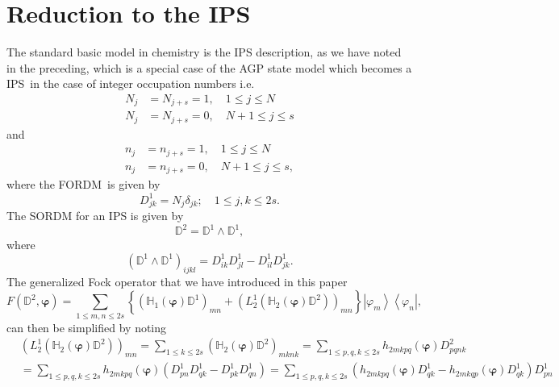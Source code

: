 \documentclass[aps,preprint]{revtex4}%
\begin{document}
\section{Reduction to the IPS \label{IPS}}

The standard basic model in chemistry is the IPS description, as we have noted
in the preceding, which is a special case of the AGP state model which becomes
a IPS\ in the case of integer occupation numbers i.e.
\begin{align}
N_{j}  &  =N_{j+s}=1,\quad1\leq j\leq N\nonumber\\
N_{j}  &  =N_{j+s}=0,\quad N+1\leq j\leq s
\end{align}
and%
\begin{align}
n_{j}  &  =n_{j+s}=1,\quad1\leq j\leq N\nonumber\\
n_{j}  &  =n_{j+s}=0,\quad N+1\leq j\leq s,
\end{align}
where the FORDM\ is given by
\begin{equation}
D_{jk}^{1}=N_{j}\delta_{jk};\quad1\leq j,k\leq2s.
\end{equation}
The SORDM for an IPS is given by
\begin{equation}
\mathbb{D}^{2}=\mathbb{D}^{1}\wedge\mathbb{D}^{1},
\end{equation}
where
\begin{equation}
\left(  \mathbb{D}^{1}\wedge\mathbb{D}^{1}\right)  _{ijkl}=D_{ik}^{1}%
D_{jl}^{1}-D_{il}^{1}D_{jk}^{1}.
\end{equation}
The generalized Fock operator that we have introduced in this paper
\begin{equation}
F\left(  \mathbb{D}^{2},\bm{\varphi}\right)  =\sum_{1\leq m,n\leq2s}\left\{
\left(  \mathbb{H}_{1}\left(  \bm{\varphi}\right)  \mathbb{D}^{1}\right)
_{mn}+\left(  L_{2}^{1}\left(  \mathbb{H}_{2}\left(  \bm{\varphi}\right)
\mathbb{D}^{2}\right)  \right)  _{mn}\right\}  \left\vert \varphi
_{m}\right\rangle \left\langle \varphi_{n}\right\vert , \label{F1}%
\end{equation}
can then be simplified by noting
\begin{align}
&  \left(  L_{2}^{1}\left(  \mathbb{H}_{2}\left(  \bm{\varphi}\right)
\mathbb{D}^{2}\right)  \right)  _{mn}=\sum_{1\leq k\leq2s}\left(
\mathbb{H}_{2}\left(  \bm{\varphi}\right)  \mathbb{D}^{2}\right)  _{mknk}%
=\sum_{1\leq p,q,k\leq2s}h_{2mkpq}\left(  \bm{\varphi}\right)  D_{pqnk}%
^{2}\nonumber\\
&  =\sum_{1\leq p,q,k\leq2s}h_{2mkpq}\left(  \bm{\varphi}\right)  \left(
D_{pn}^{1}D_{qk}^{1}-D_{pk}^{1}D_{qn}^{1}\right)  =\sum_{1\leq p,q,k\leq
2s}\left(  h_{2mkpq}\left(  \bm{\varphi}\right)  D_{qk}^{1}-h_{2mkqp}\left(
\bm{\varphi}\right)  D_{qk}^{1}\right)  D_{pn}^{1}%
\end{align}
\end{document}
